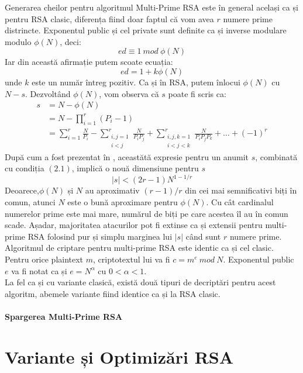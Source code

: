 \documentclass[12]{report}
\begin{document}
Generarea cheilor pentru algoritmul Multi-Prime RSA este în general același ca și pentru RSA clasic, diferența fiind doar faptul că vom avea $r$ numere prime distrincte. Exponentul public și cel private sunt definite ca și inverse modulare modulo $\phi(N)$, deci:
$$ ed \equiv 1 \ mod \ \phi(N)$$
Iar din această afirmație putem scoate ecuația:
$$ ed=1+k\phi(N)$$
unde $k$ este un număr întreg pozitiv. Ca și în RSA, putem înlocui $\phi(N)$ cu $N-s$. Dezvoltând $\phi(N)$, vom observa că $s$ poate fi scris ca:
\begin{align*}
s &= N - \phi(N) \\
&= N - \prod_{i=1}^{r} (P_i-1) \\
&= \sum_{i=1}^{r}\frac{N}{P_i} - \sum_{\substack{i,j=1 \\  i<j}}^{r} \frac{N}{P_iP_j} + \sum_{
\substack{i,j,k=1 \\ i<j<k}}^{r} \frac{N}{P_i P_j P_k} + \dots + (-1)^{r}
\end{align*}
După cum a fost prezentat în \cite{osutanoua}, aceastătă expresie pentru un anumit $s$, combinată cu condiția $(2.1)$, implică o nouă dimensiune pentru $s$
\begin{equation}
|s| < (2r-1)N^{1-1/r}
\end{equation}
Deoarece,$\phi(N)$ și $N$ au aproximativ $(r-1)/r$ din cei mai semnificativi biți în comun, atunci $N$ este o bună aproximare pentru $\phi(N)$. Cu cât cardinalul numerelor prime este mai mare, numărul de biți pe care acestea îl au în comun scade. Așadar, majoritatea atacurilor pot fi extinse ca și extensii pentru multi-prime RSA folosind pur și simplu marginea lui $|s|$ când sunt $r$ numere prime.\\
Algoritmul de criptare pentru multi-prime RSA este identic ca și cel clasic. Pentru orice plaintext $m$, criptotextul lui va fi $c = m^e \ mod \ N$. Exponentul public $e$ va fi notat ca și $e=N^{\alpha}$ cu $0<\alpha<1$.\\
La fel ca și cu variante clasică, există două tipuri de decriptări pentru acest algoritm, abemele variante fiind identice ca și la RSA clasic. 
\subsubsection{Spargerea Multi-Prime RSA}



\chapter{Variante și Optimizări RSA}
\end{document}
